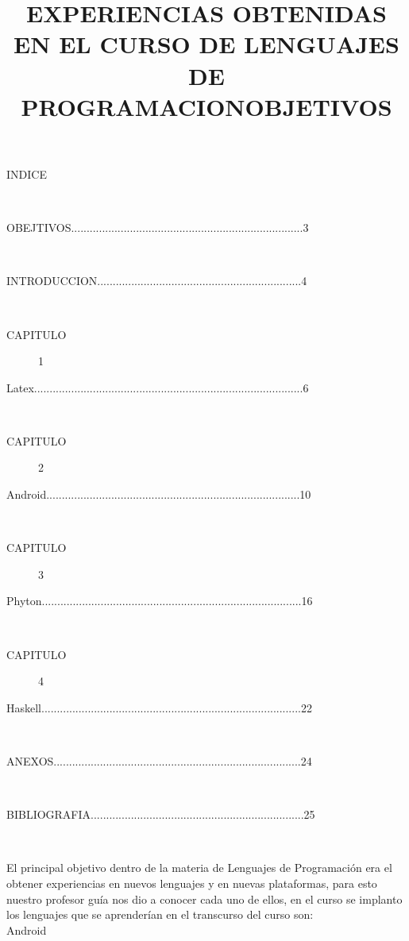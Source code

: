 \documentclass[12pt]{extbook}
\begin{document}
\title{EXPERIENCIAS OBTENIDAS EN EL CURSO DE LENGUAJES DE PROGRAMACION}\maketitle
\begin{center}
\begin{description}
\item [{INDICE}]~
\item [{OBEJTIVOS...........................................................................3}]~
\item [{INTRODUCCION..................................................................4}]~
\item [{CAPITULO}] 1
\item [{Latex.......................................................................................6}]~
\item [{CAPITULO}] 2
\item [{Android..................................................................................10}]~
\item [{CAPITULO}] 3
\item [{Phyton....................................................................................16}]~
\item [{CAPITULO}] 4
\item [{Haskell....................................................................................22}]~
\item [{ANEXOS................................................................................24}]~
\item [{BIBLIOGRAFIA.....................................................................25}]~
\end{description}


\newpage

\title{OBJETIVOS}\maketitle
\end{center}


El principal objetivo dentro de la materia de Lenguajes de Programación
era el obtener experiencias en nuevos lenguajes y en nuevas plataformas,
para esto nuestro profesor guía nos dio a conocer cada uno de ellos,
en el curso se implanto los lenguajes que se aprenderían en el transcurso
del curso son:\\

\textbullet{} Android 
\end{document}

